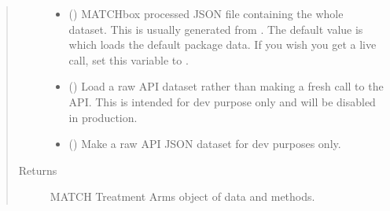 \documentclass[letterpaper,10pt,english]{sphinxmanual}
\begin{document}
\begin{fulllineitems}
\begin{quote}
\begin{description}
\begin{itemize}
%
\begin{sphinxVerbatim}[commandchars=\\\{\}]
   
\end{sphinxVerbatim}


\item {} 
 () \textendash{} MATCHbox processed JSON file containing the whole
dataset. This is usually generated from .
The default value is  which loads the default package
data. If you wish you get a live call, set this
variable to .

\item {} 
 () \textendash{} Load a raw API dataset rather than making a fresh call
to the API. This is intended for dev purpose only and will be
disabled in production.

\item {} 
 () \textendash{} Make a raw API JSON dataset for dev purposes only.

\end{itemize}

\item[{Returns}] \leavevmode
MATCH Treatment Arms object of data and methods.

\end{description}\end{quote}


\end{fulllineitems}
\end{document}
